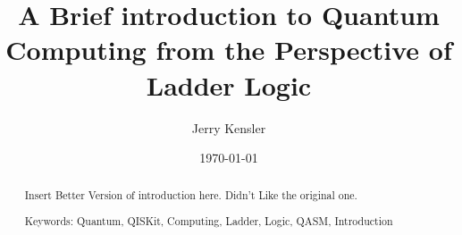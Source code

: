 \documentclass[a4paper]{article}
\title{A Brief introduction to Quantum Computing from the Perspective of Ladder Logic}
\author{Jerry Kensler}
\date{\today}
\begin{document}
\maketitle

\begin{abstract}

\begin{comment}
	
%

\end{comment}

Insert Better Version of introduction here.  Didn't Like the original one.

Keywords:  Quantum, QISKit, Computing, Ladder, Logic, QASM, Introduction
\end{abstract}
\end{document}
